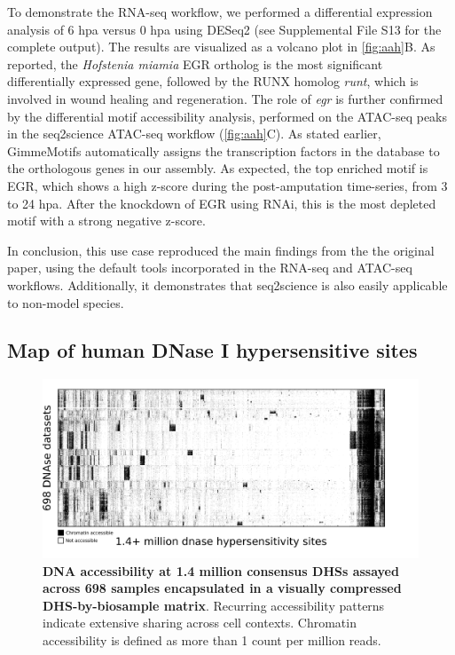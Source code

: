 To demonstrate the RNA-seq workflow, we performed a differential expression analysis of 6 hpa versus 0 hpa using DESeq2 (see  Supplemental File S13 for the complete output). The results are visualized as a volcano plot in \autoref{fig:aah}B. As reported, the \textit{Hofstenia miamia} EGR ortholog is the most significant differentially expressed gene, followed by the RUNX homolog \textit{runt}, which is involved in wound healing and regeneration. The role of \textit{egr} is further confirmed by the differential motif accessibility analysis, performed on the ATAC-seq peaks in the seq2science ATAC-seq workflow (\autoref{fig:aah}C). As stated earlier, GimmeMotifs automatically assigns the transcription factors in the database to the orthologous genes in our assembly. As expected, the top enriched motif is EGR, which shows a high z-score during the post-amputation time-series, from 3 to 24 hpa. After the knockdown of EGR using RNAi, this is the most depleted motif with a strong negative z-score. 

In conclusion, this use case reproduced the main findings from the the original paper, using the default tools incorporated in the RNA-seq and ATAC-seq workflows. Additionally, it demonstrates that seq2science is also easily applicable to non-model species.

\subsection{Map of human DNase I hypersensitive sites}

\begin{figure}
	\centering
	\includegraphics[width=\textwidth]{ch.seq2science/imgs/dnase.png}
	\caption{\label{fig:dnase} \textbf{DNA accessibility at 1.4 million consensus DHSs assayed across 698 samples encapsulated in a visually compressed DHS-by-biosample matrix}. Recurring accessibility patterns indicate extensive sharing across cell contexts. Chromatin accessibility is defined as more than 1 count per million reads. }
\end{figure}

